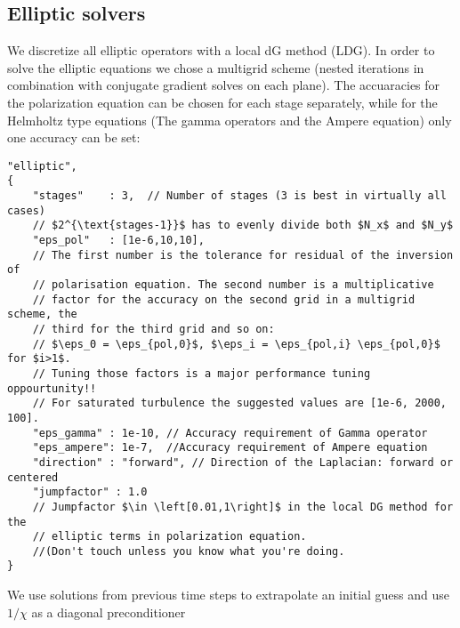 \subsection{Elliptic solvers}
We discretize all elliptic operators with a local dG method (LDG).  In order to
solve the elliptic equations we chose a multigrid scheme (nested iterations in
combination with conjugate gradient solves on each plane). The accuaracies for
the polarization equation can be chosen for each stage separately, while for
the Helmholtz type equations (The gamma operators and the Ampere equation) only
one accuracy can be set:
\begin{verbatim}
"elliptic",
{
    "stages"    : 3,  // Number of stages (3 is best in virtually all cases)
    // $2^{\text{stages-1}}$ has to evenly divide both $N_x$ and $N_y$
    "eps_pol"   : [1e-6,10,10],
    // The first number is the tolerance for residual of the inversion of
    // polarisation equation. The second number is a multiplicative
    // factor for the accuracy on the second grid in a multigrid scheme, the
    // third for the third grid and so on:
    // $\eps_0 = \eps_{pol,0}$, $\eps_i = \eps_{pol,i} \eps_{pol,0}$  for $i>1$.
    // Tuning those factors is a major performance tuning oppourtunity!!
    // For saturated turbulence the suggested values are [1e-6, 2000, 100].
    "eps_gamma" : 1e-10, // Accuracy requirement of Gamma operator
    "eps_ampere": 1e-7,  //Accuracy requirement of Ampere equation
    "direction" : "forward", // Direction of the Laplacian: forward or centered
    "jumpfactor" : 1.0
    // Jumpfactor $\in \left[0.01,1\right]$ in the local DG method for the
    // elliptic terms in polarization equation.
    //(Don't touch unless you know what you're doing.
}
\end{verbatim}
\begin{tcolorbox}[title=Note]
    We use solutions from previous time steps to extrapolate an initial guess
    and use $1/\chi$ as a diagonal preconditioner
\end{tcolorbox}
